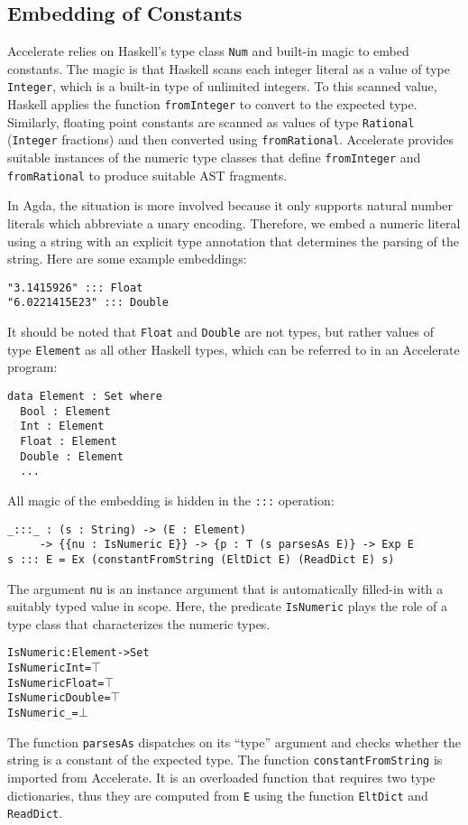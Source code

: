 \documentclass{llncs}
\begin{document}
\subsection{Embedding of Constants}
\label{sec:embedding-constants}

Accelerate relies on Haskell's type class \texttt{Num} and built-in
magic to embed constants. The magic is that Haskell scans each integer
literal as a value of type \texttt{Integer}, which is a built-in type
of unlimited integers. To this scanned value, Haskell applies the
function \texttt{fromInteger} to convert to the expected
type. Similarly, floating point constants are scanned as values of
type \texttt{Rational} (\texttt{Integer} fractions) and then converted
using \texttt{fromRational}. Accelerate provides suitable instances of
the numeric type classes that define \texttt{fromInteger} and
\texttt{fromRational} to produce suitable AST fragments.

In Agda, the situation is more involved because it only supports
natural number literals which abbreviate a unary encoding. Therefore,
we embed a numeric literal using a string with an explicit
type annotation that determines the parsing of the string. Here are
some example embeddings:
\begin{verbatim}
"3.1415926" ::: Float
"6.0221415E23" ::: Double
\end{verbatim}
It should be noted that \texttt{Float} and \texttt{Double} are not
types, but rather values of type \texttt{Element} as all other Haskell
types, which can be referred to in an Accelerate program:
\begin{verbatim}
data Element : Set where
  Bool : Element
  Int : Element
  Float : Element
  Double : Element
  ...
\end{verbatim}
All magic of the embedding is hidden in the \texttt{:::} operation:
\begin{verbatim}
_:::_ : (s : String) -> (E : Element) 
     -> {{nu : IsNumeric E}} -> {p : T (s parsesAs E)} -> Exp E
s ::: E = Ex (constantFromString (EltDict E) (ReadDict E) s)
\end{verbatim}
The argument \texttt{nu} is an instance argument that is automatically
filled-in with a suitably typed value in scope. Here, the predicate
\texttt{IsNumeric} plays the role of a type class that characterizes
the numeric types.
\begin{alltt}
IsNumeric : Element -> Set
IsNumeric Int = \(\top\)
IsNumeric Float = \(\top\)
IsNumeric Double = \(\top\)
IsNumeric _ = \(\bot\)
\end{alltt}
The function \texttt{parsesAs} dispatches on its ``type'' argument and
checks whether the string is a constant of the expected type. The
function \texttt{constantFromString} is imported from Accelerate.
It is an overloaded function that requires two type dictionaries, thus
they are computed from \texttt{E} using the function \texttt{EltDict}
and \texttt{ReadDict}. 
\end{document}
